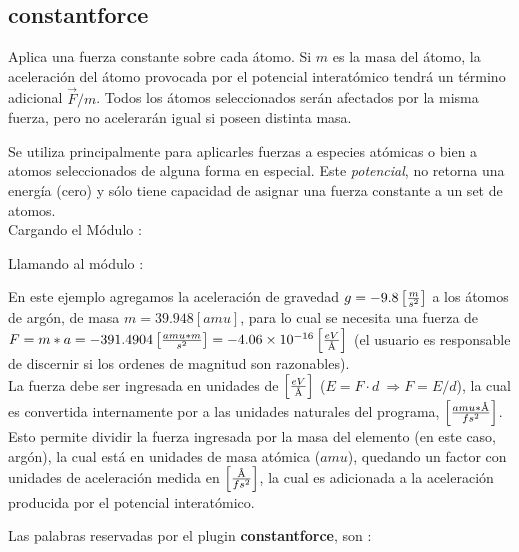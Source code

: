 \subsection{constantforce}
Aplica una fuerza constante sobre cada \'atomo. Si $m$ es la masa del \'atomo,
la aceleraci\'on del \'atomo provocada por el potencial interat\'omico tendr\'a
un t\'ermino adicional $\vec F/m$. Todos los \'atomos seleccionados ser\'an
afectados por la misma fuerza, pero no acelerar\'an igual si poseen distinta
masa.

Se utiliza principalmente para aplicarles fuerzas a especies at\'omicas o bien a
atomos seleccionados de alguna forma en especial. Este \textit{potencial}, no
retorna una energ\'ia (cero) y s\'olo tiene capacidad de asignar una fuerza
constante a un set de atomos.\\
                                       
Cargando el M\'odulo :

Llamando al m\'odulo :


En este ejemplo agregamos la aceleraci\'on de gravedad $g=-9.8\left[m\over
s^2\right]$ a los \'atomos de arg\'on, de masa $m=39.948 [amu]$, para lo cual se
necesita una fuerza de $F=m*a=-391.4904 \left[amu*m\over
s^2\right]=-4.06\times10^{-16}\left[eV\over \text\AA\right]$ (el usuario es
responsable de discernir si los ordenes de magnitud son razonables).\\

La fuerza debe ser ingresada en unidades de $\left[eV \over \text\AA\right]$
($E=F\cdot d\ \Rightarrow F=E/d$), la cual es convertida internamente por
{\lpmd} a las unidades naturales del programa, $\left[amu*\text\AA\over
fs^2\right]$. Esto permite dividir la fuerza ingresada por la masa del elemento
(en este caso, arg\'on), la cual est\'a en unidades de masa at\'omica ($amu$),
quedando un factor con unidades de aceleraci\'on medida en $\left[\text\AA\over
fs^2\right]$, la cual es adicionada a la aceleraci\'on producida por el
potencial interat\'omico.


Las palabras reservadas por el plugin \textbf{constantforce}, son :


